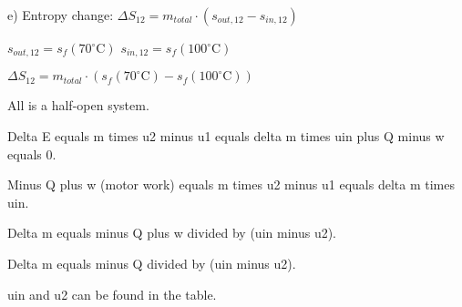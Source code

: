 e) Entropy change:  
\( \Delta S_{12} = m_{total} \cdot (s_{out,12} - s_{in,12}) \)  

\( s_{out,12} = s_f(70^\circ \text{C}) \)  
\( s_{in,12} = s_f(100^\circ \text{C}) \)  

\( \Delta S_{12} = m_{total} \cdot (s_f(70^\circ \text{C}) - s_f(100^\circ \text{C})) \)

All is a half-open system.  

Delta E equals m times u2 minus u1 equals delta m times uin plus Q minus w equals 0.  

Minus Q plus w (motor work) equals m times u2 minus u1 equals delta m times uin.  

Delta m equals minus Q plus w divided by (uin minus u2).  

Delta m equals minus Q divided by (uin minus u2).  

uin and u2 can be found in the table.